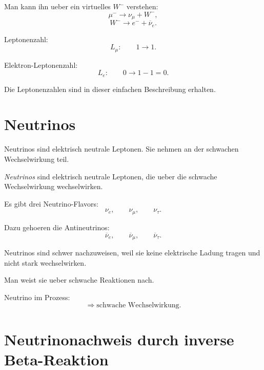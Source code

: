 \begin{conceptbox}
Man kann ihn ueber ein virtuelles $W^-$ verstehen:
\[
    \mu^- \rightarrow \nu_\mu + W^-,
\]
\[
    W^- \rightarrow e^- + \overline{\nu}_e.
\]
\end{conceptbox}

\begin{examplebox}
Leptonenzahl:
\[
    L_\mu:
    \qquad
    1 \rightarrow 1.
\]

Elektron-Leptonenzahl:
\[
    L_e:
    \qquad
    0 \rightarrow 1-1=0.
\]

Die Leptonenzahlen sind in dieser einfachen Beschreibung erhalten.
\end{examplebox}

\section{Neutrinos}

Neutrinos sind elektrisch neutrale Leptonen.
Sie nehmen an der schwachen Wechselwirkung teil.

\begin{definitionbox}
\emph{Neutrinos} sind elektrisch neutrale Leptonen, die ueber die schwache
Wechselwirkung wechselwirken.
\end{definitionbox}

\begin{conceptbox}
Es gibt drei Neutrino-Flavors:
\[
    \nu_e,
    \qquad
    \nu_\mu,
    \qquad
    \nu_\tau.
\]

Dazu gehoeren die Antineutrinos:
\[
    \overline{\nu}_e,
    \qquad
    \overline{\nu}_\mu,
    \qquad
    \overline{\nu}_\tau.
\]
\end{conceptbox}

\begin{notebox}
Neutrinos sind schwer nachzuweisen, weil sie keine elektrische Ladung tragen und
nicht stark wechselwirken.

Man weist sie ueber schwache Reaktionen nach.
\end{notebox}

\begin{examtipbox}
Neutrino im Prozess:
\[
    \Rightarrow
    \text{schwache Wechselwirkung}.
\]
\end{examtipbox}

\section{Neutrinonachweis durch inverse Beta-Reaktion}

